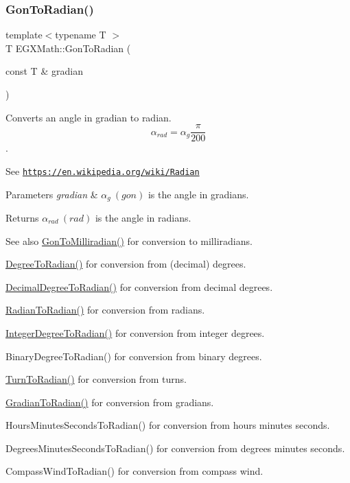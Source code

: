 \subsubsection{\texorpdfstring{Gon\+To\+Radian()}{GonToRadian()}}
{\footnotesize\ttfamily template$<$typename T $>$ \\
T E\+G\+X\+Math\+::\+Gon\+To\+Radian (\begin{DoxyParamCaption}\item[{const T \&}]{gradian }\end{DoxyParamCaption})}



Converts an angle in gradian to radian. \[\alpha_{rad}=\alpha_{g}\frac{\pi}{200}\]. 

See \href{https://en.wikipedia.org/wiki/Radian}{\tt https\+://en.\+wikipedia.\+org/wiki/\+Radian} 
\begin{DoxyParams}{Parameters}
{\em gradian} & $\alpha_{g}\ (gon)$ is the angle in gradians. \\
\hline
\end{DoxyParams}
\begin{DoxyReturn}{Returns}
$\alpha_{rad}\ (rad)$ is the angle in radians. 
\end{DoxyReturn}
\begin{DoxySeeAlso}{See also}
\mbox{\hyperlink{group___e_g_x_math-_angle_conversions-_gon_gae5956f7e80b143f3cc22eb8122c1b745}{Gon\+To\+Milliradian()}} for conversion to milliradians. 

\mbox{\hyperlink{group___e_g_x_math-_angle_conversions-_degree_ga48585541b228c852c9d08a9eac3682f0}{Degree\+To\+Radian()}} for conversion from (decimal) degrees. 

\mbox{\hyperlink{group___e_g_x_math-_angle_conversions-_decimal_degree_ga906ee2c83cdf4caa59eb613dc2d5d52a}{Decimal\+Degree\+To\+Radian()}} for conversion from decimal degrees. 

\mbox{\hyperlink{group___e_g_x_math-_angle_conversions-_radian_gae08681bd86b8e7e4325f6c8cb3a0dc37}{Radian\+To\+Radian()}} for conversion from radians. 

\mbox{\hyperlink{group___e_g_x_math-_angle_conversions-_integer_degree_ga05d3368b00ea27b9895de2ffe5c8df38}{Integer\+Degree\+To\+Radian()}} for conversion from integer degrees. 

Binary\+Degree\+To\+Radian() for conversion from binary degrees. 

\mbox{\hyperlink{group___e_g_x_math-_angle_conversions-_turn_ga72e6d3c46ebfc25f7be5050136d8df16}{Turn\+To\+Radian()}} for conversion from turns. 

\mbox{\hyperlink{group___e_g_x_math-_angle_conversions-_gradian_ga7ea0a6f47a672715b960181606c8fd7b}{Gradian\+To\+Radian()}} for conversion from gradians. 

Hours\+Minutes\+Seconds\+To\+Radian() for conversion from hours minutes seconds. 

Degrees\+Minutes\+Seconds\+To\+Radian() for conversion from degrees minutes seconds. 

Compass\+Wind\+To\+Radian() for conversion from compass wind. 
\end{DoxySeeAlso}
